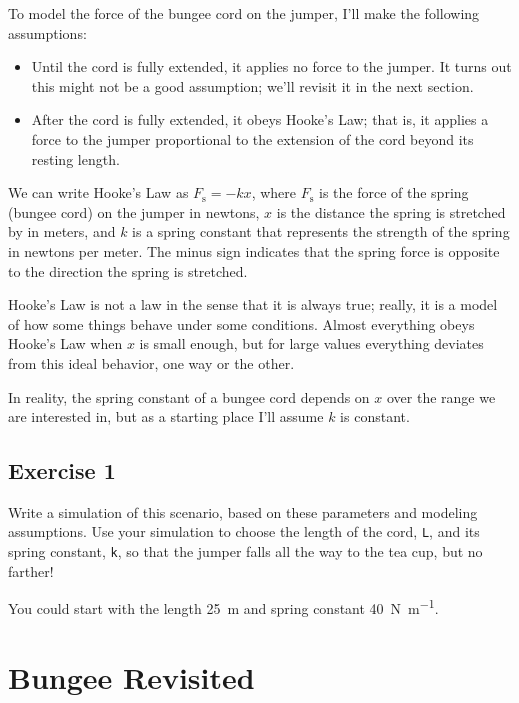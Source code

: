 To model the force of the bungee cord on the jumper, I'll make the following assumptions:

\begin{itemize}

\item Until the cord is fully extended, it applies no force to the jumper.  It turns out this might not be a good assumption; we'll revisit it in the next section.

\item After the cord is fully extended, it obeys Hooke's Law; that is, it applies a force to the jumper proportional to the extension of the cord beyond its resting length.

\end{itemize}

We can write Hooke's Law as
%
$F_\mathrm{s} = -k x$,
%
where $F_\mathrm{s}$ is the force of the spring (bungee cord) on the jumper in newtons, $x$ is the distance the spring is stretched by in meters, and $k$ is a spring constant that represents the strength of the spring in newtons per meter.
The minus sign indicates that the spring force is opposite to the direction the spring is stretched.


Hooke's Law is not a law in the sense that it is always true; really, it is a model of how some things behave under some conditions.
Almost everything obeys Hooke's Law when $x$ is small enough, but for large values everything deviates from this ideal behavior, one way or the other.

In reality, the spring constant of a bungee cord depends on $x$ over the range we are interested in, but as a starting place I'll assume $k$ is constant.


\subsection{Exercise 1}

Write a simulation of this scenario, based on these parameters and modeling assumptions.
Use your simulation to choose the length of the cord, \lstinline{L}, and its spring constant, \lstinline{k}, so that the jumper falls all the way to the tea cup, but no farther!

You could start with the length \SI{25}{\meter} and spring constant \SI{40}{\newton \per \meter}.


\section{Bungee Revisited}

